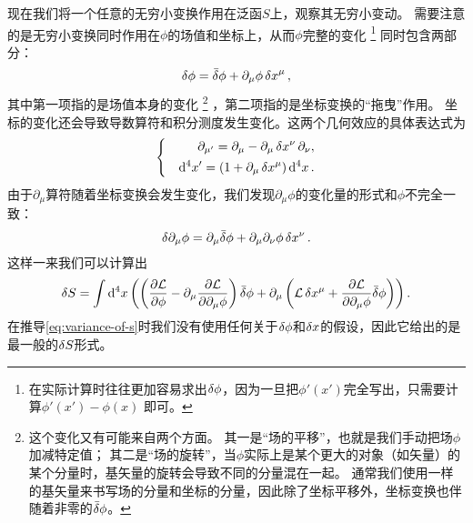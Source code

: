 \documentclass[UTF8, a4paper]{ctexart}
\newenvironment{bigcase}{\left\{\quad\begin{aligned}}{\end{aligned}\right.}
\begin{document}
现在我们将一个任意的无穷小变换作用在泛函$S$上，观察其无穷小变动。
需要注意的是无穷小变换同时作用在$\phi$的场值和坐标上，从而$\phi$完整的变化%
\footnote{在实际计算时往往更加容易求出$\var{\phi}$，因为一旦把$\phi'(x')$完全写出，只需要计算$\phi'(x')-\phi(x)$ 即可。}%
同时包含两部分：
\begin{equation}
    \var{\phi} = \bar{\var} \phi + \partial_\mu \phi \var{x}^\mu,
    \label{eq:variance-of-phi}
\end{equation}
其中第一项指的是场值本身的变化%
\footnote{这个变化又有可能来自两个方面。
其一是“场的平移”，也就是我们手动把场$\phi$加减特定值；
其二是“场的旋转”，当$\phi$实际上是某个更大的对象（如矢量）的某个分量时，基矢量的旋转会导致不同的分量混在一起。
通常我们使用一样的基矢量来书写场的分量和坐标的分量，因此除了坐标平移外，坐标变换也伴随着非零的$\bar{\var}{\phi}$。}%
，第二项指的是坐标变换的“拖曳”作用。
坐标的变化还会导致导数算符和积分测度发生变化。这两个几何效应的具体表达式为
\begin{equation}
    \begin{bigcase}
        \partial_{\mu'} = \partial_\mu - \partial_\mu \var{x^\nu} \partial_\nu, \\
        \dd[4]{x'} = (1 + \partial_\mu \var{x^\mu}) \dd[4]{x}.
    \end{bigcase}
\end{equation}
由于$\partial_\mu$算符随着坐标变换会发生变化，我们发现$\partial_\mu \phi$的变化量的形式和$\phi$不完全一致：
\begin{equation}
    \var{\partial_\mu \phi} = \partial_\mu \bar{\var}{\phi} + \partial_\mu \partial_\nu \phi \var{x^\nu}.
\end{equation}
这样一来我们可以计算出
\begin{equation}
    \var{S} = \int \dd[4]{x} \left(
        \left( \pdv{\mathcal{L}}{\phi} - \partial_\mu \pdv{\mathcal{L}}{\partial_\mu \phi} \right) \bar{\var}{\phi} + 
        \partial_\mu \left( \mathcal{L} \var{x^\mu} + \pdv{\mathcal{L}}{\partial_\mu \phi} \bar{\var}{\phi} \right)
    \right).
    \label{eq:variance-of-s}
\end{equation}
在推导\eqref{eq:variance-of-s}时我们没有使用任何关于$\var{\phi}$和$\var{x}$的假设，因此它给出的是最一般的$\var{S}$形式。
\end{document}

